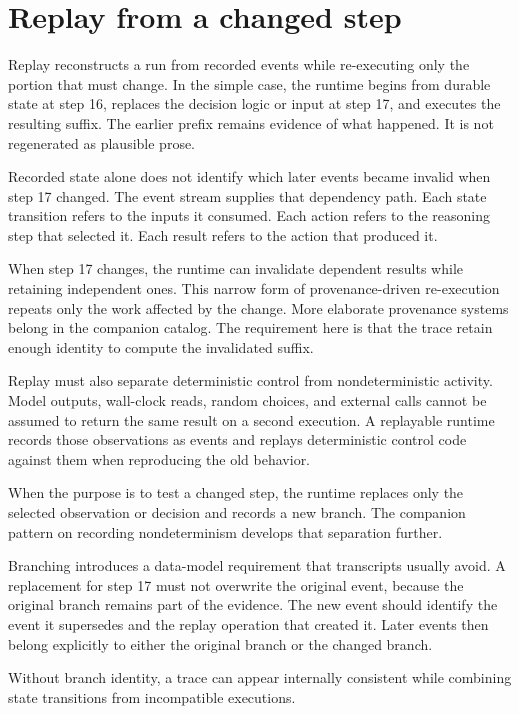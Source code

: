 \hypertarget{replay-from-a-changed-step}{%
\section{Replay from a changed step}\label{replay-from-a-changed-step}}

Replay reconstructs a run from recorded events while re-executing only the portion that must change. In the simple case, the runtime begins from durable state at step 16, replaces the decision logic or input at step 17, and executes the resulting suffix. The earlier prefix remains evidence of what happened. It is not regenerated as plausible prose.

Recorded state alone does not identify which later events became invalid when step 17 changed. The event stream supplies that dependency path. Each state transition refers to the inputs it consumed. Each action refers to the reasoning step that selected it. Each result refers to the action that produced it.

When step 17 changes, the runtime can invalidate dependent results while retaining independent ones. This narrow form of provenance-driven re-execution repeats only the work affected by the change. More elaborate provenance systems belong in the companion catalog. The requirement here is that the trace retain enough identity to compute the invalidated suffix.

Replay must also separate deterministic control from nondeterministic activity. Model outputs, wall-clock reads, random choices, and external calls cannot be assumed to return the same result on a second execution. A replayable runtime records those observations as events and replays deterministic control code against them when reproducing the old behavior.

When the purpose is to test a changed step, the runtime replaces only the selected observation or decision and records a new branch. The companion pattern on recording nondeterminism develops that separation further.

Branching introduces a data-model requirement that transcripts usually avoid. A replacement for step 17 must not overwrite the original event, because the original branch remains part of the evidence. The new event should identify the event it supersedes and the replay operation that created it. Later events then belong explicitly to either the original branch or the changed branch.

Without branch identity, a trace can appear internally consistent while combining state transitions from incompatible executions.

